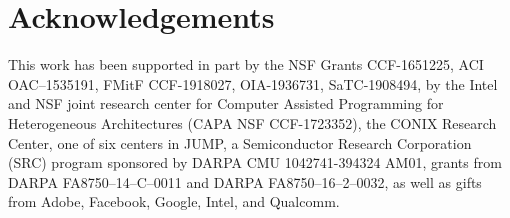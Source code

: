 \section*{Acknowledgements}
%
This work has been supported in part by 
the NSF Grants CCF-1651225, ACI OAC--1535191, FMitF CCF-1918027, OIA-1936731, SaTC-1908494,
%
by the Intel and NSF joint research center for Computer Assisted Programming for Heterogeneous Architectures (CAPA NSF CCF-1723352), 
%
the CONIX Research Center, one of six centers in JUMP, a Semiconductor Research Corporation (SRC) program sponsored by DARPA CMU 1042741-394324 AM01,
%
grants from DARPA FA8750--14--C--0011 and DARPA FA8750--16--2--0032, 
%
as well as gifts from Adobe, Facebook, Google, Intel, and Qualcomm. 
%